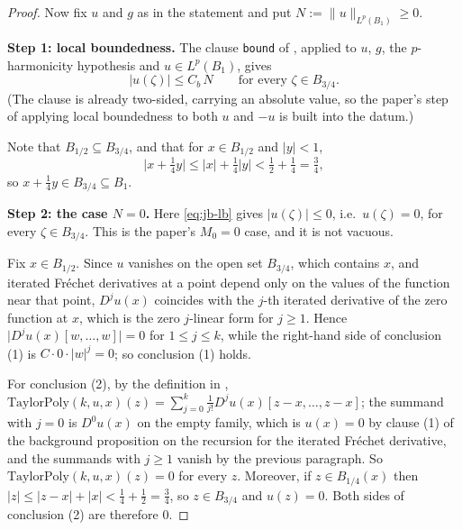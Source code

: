 \begin{proof}
Now fix $u$ and $g$ as in the statement and put $N:=\lVert u\rVert_{L^{p}(B_1)}\ge0$.

\medskip\noindent\textbf{Step 1: local boundedness.}
The clause \texttt{bound} of , applied to $u$, $g$, the
$p$-harmonicity hypothesis and $u\in L^{p}(B_1)$, gives
\begin{equation}\label{eq:jb-lb}
  \lvert u(\zeta)\rvert\le C_b\,N\qquad\text{for every }\zeta\in B_{3/4}.
\end{equation}
(The clause is already two-sided, carrying an absolute value, so the paper's step of applying
local boundedness to both $u$ and $-u$ is built into the datum.)

Note that $B_{1/2}\subseteq B_{3/4}$, and that for $x\in B_{1/2}$ and $\lvert y\rvert<1$,
\begin{equation}\label{eq:jb-incl}
  \bigl\lvert x+\tfrac14y\bigr\rvert\le\lvert x\rvert+\tfrac14\lvert y\rvert
  <\tfrac12+\tfrac14=\tfrac34,
\end{equation}
so $x+\tfrac14y\in B_{3/4}\subseteq B_1$.

\medskip\noindent\textbf{Step 2: the case $N=0$.}
Here \eqref{eq:jb-lb} gives $\lvert u(\zeta)\rvert\le0$, i.e.\ $u(\zeta)=0$, for every
$\zeta\in B_{3/4}$.  This is the paper's $M_0=0$ case, and it is not vacuous.

Fix $x\in B_{1/2}$.  Since $u$ vanishes on the open set $B_{3/4}$, which contains $x$, and
iterated Fr\'echet derivatives at a point depend only on the values of the function near that
point, $D^{j}u(x)$ coincides with the $j$-th iterated derivative of the zero function at $x$,
which is the zero $j$-linear form for $j\ge1$.  Hence
$\lvert D^{j}u(x)[w,\ldots,w]\rvert=0$ for $1\le j\le k$, while the right-hand side of
conclusion (1) is $C\cdot0\cdot\lvert w\rvert^{j}=0$; so conclusion (1) holds.

For conclusion (2), by the definition in ,
$\mathrm{TaylorPoly}(k,u,x)(z)=\sum_{j=0}^{k}\frac{1}{j!}D^{j}u(x)[z-x,\ldots,z-x]$; the
summand with $j=0$ is $D^{0}u(x)$ on the empty family, which is $u(x)=0$ by clause (1) of the
background proposition on the recursion for the iterated Fr\'echet derivative, and the summands
with $j\ge1$ vanish by the previous paragraph.  So $\mathrm{TaylorPoly}(k,u,x)(z)=0$ for every
$z$.  Moreover, if $z\in B_{1/4}(x)$ then
$\lvert z\rvert\le\lvert z-x\rvert+\lvert x\rvert<\tfrac14+\tfrac12=\tfrac34$, so
$z\in B_{3/4}$ and $u(z)=0$.  Both sides of conclusion (2) are therefore $0$.


\end{proof}

